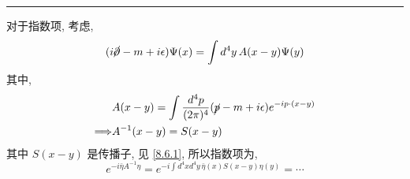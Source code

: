 \begin{itemize}
\begin{tcolorbox}[title=calculation:]
		\noindent\rule[0.5ex]{\linewidth}{0.5pt} %
		
		对于指数项, 考虑,
		\begin{equation}
			(i \cancel{\partial} - m + i \epsilon) \Psi(x) = \int d^4 y \, A(x - y) \Psi(y)
		\end{equation}
		其中,
		\begin{align}
			& A(x - y) = \int \frac{d^4 p}{(2 \pi)^4} (\cancel{p} - m + i \epsilon) e^{- i p \cdot (x - y)} \notag \\
			\Longrightarrow & A^{- 1}(x - y) = S(x - y)
		\end{align}
		其中 $S(x - y)$ 是传播子, 见 \eqref{8.6.1}, 所以指数项为,
		\begin{equation}
			e^{- i \bar{\eta} A^{- 1} \eta} = e^{- i \int d^4 x d^4 y \, \bar{\eta}(x) S(x - y) \eta(y)} = \cdots
		\end{equation}
	\end{tcolorbox}
\end{itemize}

